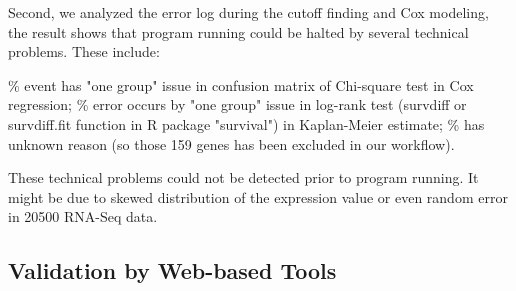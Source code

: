 \documentclass[jpm,article,submit,moreauthors,pdftex]{Definitions/mdpi}
\newenvironment{MyColorPar}[1]{%
    \leavevmode\color{#1}\ignorespaces%
}{%
}%
\begin{document}
\begin{paracol}{2}
\begin{MyColorPar}{red}



Second, we analyzed the error log during the cutoff finding and Cox modeling, 
the result shows that program running could be halted by several technical problems.
These include:
\begin{outline}

\% event has "one group" issue in confusion matrix of Chi-square test in Cox regression;
\% error occurs by "one group" issue in log-rank test (survdiff or survdiff.fit function in R package "survival") in Kaplan-Meier estimate;
\% has unknown reason (so those 159 genes has been excluded in our workflow).
\end{outline}
These technical problems could not be detected prior to program running.
It might be due to skewed distribution of the expression value or even random error in 20500 RNA-Seq data. %

\end{MyColorPar} %



\subsection{Validation by Web-based Tools}


\end{paracol}
\end{document}
